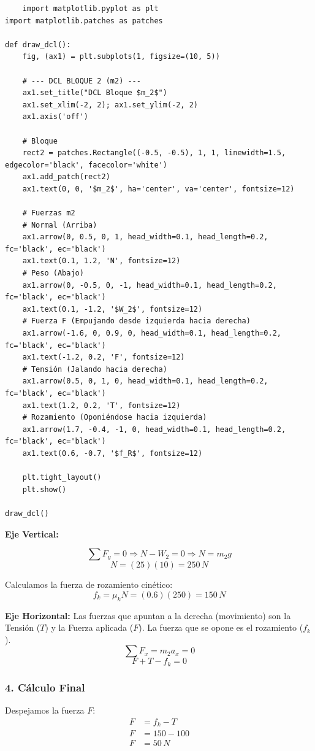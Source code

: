 \documentclass[12pt, a4paper]{article}
\begin{document}
\begin{lstlisting}
    import matplotlib.pyplot as plt
import matplotlib.patches as patches

def draw_dcl():
    fig, (ax1) = plt.subplots(1, figsize=(10, 5))
    
    # --- DCL BLOQUE 2 (m2) ---
    ax1.set_title("DCL Bloque $m_2$")
    ax1.set_xlim(-2, 2); ax1.set_ylim(-2, 2)
    ax1.axis('off')
    
    # Bloque
    rect2 = patches.Rectangle((-0.5, -0.5), 1, 1, linewidth=1.5, edgecolor='black', facecolor='white')
    ax1.add_patch(rect2)
    ax1.text(0, 0, '$m_2$', ha='center', va='center', fontsize=12)
    
    # Fuerzas m2
    # Normal (Arriba)
    ax1.arrow(0, 0.5, 0, 1, head_width=0.1, head_length=0.2, fc='black', ec='black')
    ax1.text(0.1, 1.2, 'N', fontsize=12)
    # Peso (Abajo)
    ax1.arrow(0, -0.5, 0, -1, head_width=0.1, head_length=0.2, fc='black', ec='black')
    ax1.text(0.1, -1.2, '$W_2$', fontsize=12)
    # Fuerza F (Empujando desde izquierda hacia derecha)
    ax1.arrow(-1.6, 0, 0.9, 0, head_width=0.1, head_length=0.2, fc='black', ec='black')
    ax1.text(-1.2, 0.2, 'F', fontsize=12)
    # Tensión (Jalando hacia derecha)
    ax1.arrow(0.5, 0, 1, 0, head_width=0.1, head_length=0.2, fc='black', ec='black')
    ax1.text(1.2, 0.2, 'T', fontsize=12)
    # Rozamiento (Oponiéndose hacia izquierda)
    ax1.arrow(1.7, -0.4, -1, 0, head_width=0.1, head_length=0.2, fc='black', ec='black')
    ax1.text(0.6, -0.7, '$f_R$', fontsize=12)

    plt.tight_layout()
    plt.show()

draw_dcl()
\end{lstlisting}

\textbf{Eje Vertical:}

$$ \sum F_y = 0 \Rightarrow N - W_2 = 0 \Rightarrow N = m_2 g $$
$$ N = (25)(10) = 250 \, \si{N} $$

Calculamos la fuerza de rozamiento cinético:
$$ f_k = \mu_k N = (0.6)(250) = 150 \, \si{N} $$

\textbf{Eje Horizontal:}
Las fuerzas que apuntan a la derecha (movimiento) son la Tensión ($T$) y la Fuerza aplicada ($F$). La fuerza que se opone es el rozamiento ($f_k$).
$$ \sum F_x = m_2 a_x = 0 $$
$$ F + T - f_k = 0 $$

\subsubsection*{4. Cálculo Final}
Despejamos la fuerza $F$:
\begin{align*}
    F &= f_k - T \\
    F &= 150 - 100 \\
    F &= 50 \, \si{N}
\end{align*}
\end{document}
